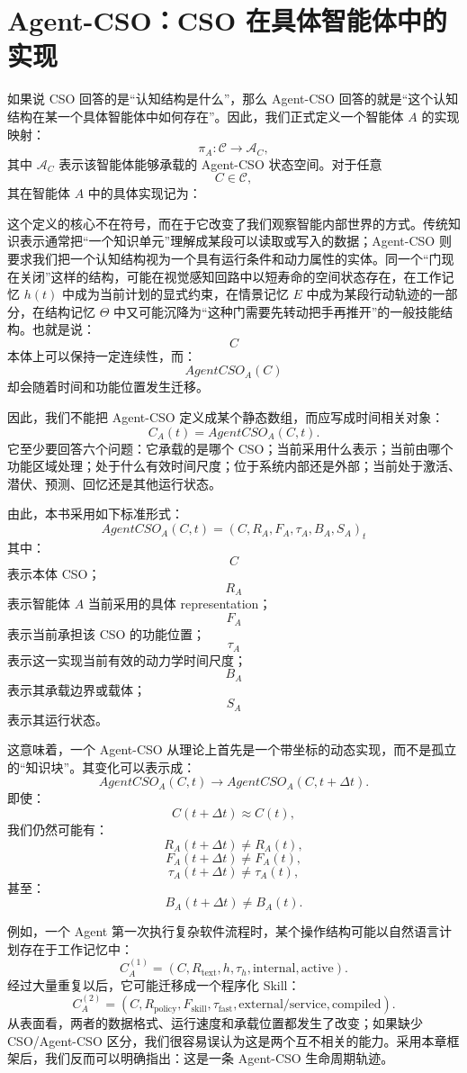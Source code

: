 \section{Agent-CSO：CSO 在具体智能体中的实现}

如果说 CSO 回答的是“认知结构是什么”，那么 Agent-CSO 回答的就是“这个认知结构在某一个具体智能体中如何存在”。因此，我们正式定义一个智能体 $A$ 的实现映射：
\[
\pi_A:
\mathcal C
\rightarrow
\mathcal A_C,
\]
其中 $\mathcal A_C$ 表示该智能体能够承载的 Agent-CSO 状态空间。对于任意
\[
C\in\mathcal C,
\]
其在智能体 $A$ 中的具体实现记为：
\begin{statementbox}
\centering
{}
\end{statementbox}

这个定义的核心不在符号，而在于它改变了我们观察智能内部世界的方式。传统知识表示通常把“一个知识单元”理解成某段可以读取或写入的数据；Agent-CSO 则要求我们把一个认知结构视为一个具有运行条件和动力属性的实体。同一个“门现在关闭”这样的结构，可能在视觉感知回路中以短寿命的空间状态存在，在工作记忆 $h(t)$ 中成为当前计划的显式约束，在情景记忆 $E$ 中成为某段行动轨迹的一部分，在结构记忆 $\Theta$ 中又可能沉降为“这种门需要先转动把手再推开”的一般技能结构。也就是说：
\[
C
\]
本体上可以保持一定连续性，而：
\[
AgentCSO_A(C)
\]
却会随着时间和功能位置发生迁移。

因此，我们不能把 Agent-CSO 定义成某个静态数组，而应写成时间相关对象：
\[
C_A(t)
=
AgentCSO_A(C,t).
\]
它至少要回答六个问题：它承载的是哪个 CSO；当前采用什么表示；当前由哪个功能区域处理；处于什么有效时间尺度；位于系统内部还是外部；当前处于激活、潜伏、预测、回忆还是其他运行状态。

由此，本书采用如下标准形式：
\[
\boxed{
AgentCSO_A(C,t)
=
\left(
C,
R_A,
F_A,
\tau_A,
B_A,
S_A
\right)_t
}
\]
其中：
\[
C
\]
表示本体 CSO；
\[
R_A
\]
表示智能体 $A$ 当前采用的具体 representation；
\[
F_A
\]
表示当前承担该 CSO 的功能位置；
\[
\tau_A
\]
表示这一实现当前有效的动力学时间尺度；
\[
B_A
\]
表示其承载边界或载体；
\[
S_A
\]
表示其运行状态。

这意味着，一个 Agent-CSO 从理论上首先是一个带坐标的动态实现，而不是孤立的“知识块”。其变化可以表示成：
\[
AgentCSO_A(C,t)
\rightarrow
AgentCSO_A(C,t+\Delta t).
\]
即使：
\[
C(t+\Delta t)\approx C(t),
\]
我们仍然可能有：
\[
R_A(t+\Delta t)\neq R_A(t),
\]
\[
F_A(t+\Delta t)\neq F_A(t),
\]
\[
\tau_A(t+\Delta t)\neq\tau_A(t),
\]
甚至：
\[
B_A(t+\Delta t)\neq B_A(t).
\]

例如，一个 Agent 第一次执行复杂软件流程时，某个操作结构可能以自然语言计划存在于工作记忆中：
\[
C_A^{(1)}
=
(C,R_{\text{text}},h,\tau_h,\text{internal},\text{active}).
\]
经过大量重复以后，它可能迁移成一个程序化 Skill：
\[
C_A^{(2)}
=
(C,R_{\text{policy}},F_{\text{skill}},\tau_{\text{fast}},
\text{external/service},\text{compiled}).
\]
从表面看，两者的数据格式、运行速度和承载位置都发生了改变；如果缺少 CSO/Agent-CSO 区分，我们很容易误认为这是两个互不相关的能力。采用本章框架后，我们反而可以明确指出：这是一条 Agent-CSO 生命周期轨迹。

